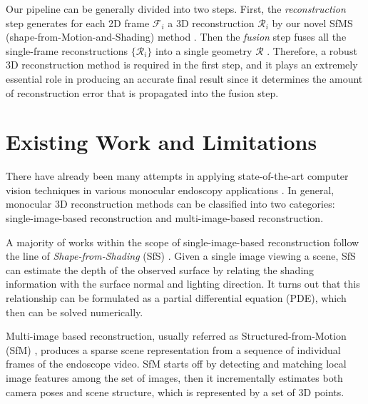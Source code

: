 \documentclass{llncs}
\begin{document}
Our pipeline can be generally divided into two steps. First, the \textit{reconstruction} step generates for each 2D frame $\mathcal{F}_i$ a 3D reconstruction $\mathcal{R}_i$ by our novel SfMS (shape-from-Motion-and-Shading) method \cite{price16}. Then the \textit{fusion} step fuses all the single-frame reconstructions $\{\mathcal{R}_i\}$ into a single geometry $\mathcal{R}$ \cite{zhao16}. Therefore, a robust 3D reconstruction method is required in the first step, and it plays an extremely essential role in producing an accurate final result since it determines the amount of reconstruction error that is propagated into the fusion step.

\section{Existing Work and Limitations}

There have already been many attempts in applying state-of-the-art computer vision techniques in various monocular endoscopy applications \cite{armin2015,hong2014,MH2013}. In general, monocular 3D reconstruction methods can be classified into two categories: single-image-based reconstruction and multi-image-based reconstruction.

A majority of works within the scope of single-image-based reconstruction follow the line of \textit{Shape-from-Shading} (SfS) \cite{ahmed2006}. Given a single image viewing a scene, SfS can estimate the depth of the observed surface by relating the shading information with the surface normal and lighting direction. It turns out that this relationship can be formulated as a partial differential equation (PDE), which then can be solved numerically.

Multi-image based reconstruction, usually referred as Structured-from-Motion (SfM) \cite{schonberger2016}, produces a sparse scene representation from a sequence of individual frames of the endoscope video. SfM starts off by detecting and matching local image features among the set of images, then it incrementally estimates both camera poses and scene structure, which is represented by a set of 3D points.
\end{document}
